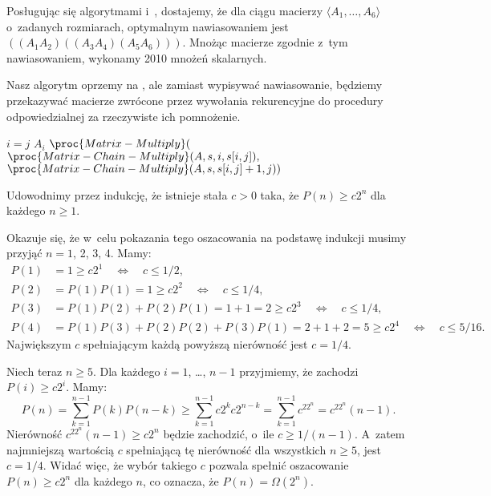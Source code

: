 
\exercise %
Posługując się algorytmami  i~, dostajemy, że dla ciągu macierzy $\langle A_1,\dots,A_6\rangle$ o~zadanych rozmiarach, optymalnym nawiasowaniem jest $((A_1A_2)((A_3A_4)(A_5A_6)))$.
Mnożąc macierze zgodnie z~tym nawiasowaniem, wykonamy 2010 mnożeń skalarnych.

\exercise %
Nasz algorytm oprzemy na , ale zamiast wypisywać nawiasowanie, będziemy przekazywać macierze zwrócone przez wywołania rekurencyjne do procedury odpowiedzialnej za rzeczywiste ich pomnożenie.
\begin{codebox}
\li	\If $i=j$
\li		\Then \Return $A_i$
		\End
\li	\Return $\proc{Matrix-Multiply}($
\zi	\>\>\> $\proc{Matrix-Chain-Multiply}(A,s,i,s[i,j]),$
\zi	\>\>\> $\proc{Matrix-Chain-Multiply}(A,s,s[i,j]+1,j))$
\end{codebox}

\exercise %
Udowodnimy przez indukcję, że istnieje stała $c>0$ taka, że $P(n)\ge c2^n$ dla każdego $n\ge1$.

Okazuje się, że w~celu pokazania tego oszacowania na podstawę indukcji musimy przyjąć $n=1$, 2, 3, 4.
Mamy:
\begin{align*}
	P(1) &= 1 \ge c2^1 \quad\Leftrightarrow\quad c \le 1/2, \\
	P(2) &= P(1)P(1) = 1 \ge c2^2 \quad\Leftrightarrow\quad c \le 1/4, \\
	P(3) &= P(1)P(2)+P(2)P(1) = 1+1 = 2 \ge c2^3 \quad\Leftrightarrow\quad c \le 1/4, \\
	P(4) &= P(1)P(3)+P(2)P(2)+P(3)P(1) = 2+1+2 = 5 \ge c2^4 \quad\Leftrightarrow\quad c \le 5/16.
\end{align*}
Największym $c$ spełniającym każdą powyższą nierówność jest $c=1/4$.

Niech teraz $n\ge5$.
Dla każdego $i=1$, \dots, $n-1$ przyjmiemy, że zachodzi $P(i)\ge c2^i$.
Mamy:
\[
	P(n) = \sum_{k=1}^{n-1}P(k)P(n-k) \ge \sum_{k=1}^{n-1}c2^kc2^{n-k} = \sum_{k=1}^{n-1}c^22^n = c^22^n(n-1).
\]
Nierówność $c^22^n(n-1)\ge c2^n$ będzie zachodzić, o~ile $c\ge1/(n-1)$.
A~zatem najmniejszą wartością $c$ spełniającą tę nierówność dla wszystkich $n\ge5$, jest $c=1/4$.
Widać więc, że wybór takiego $c$ pozwala spełnić oszacowanie $P(n)\ge c2^n$ dla każdego $n$, co oznacza, że $P(n)=\Omega(2^n)$.

\exercise %
\exercise %
